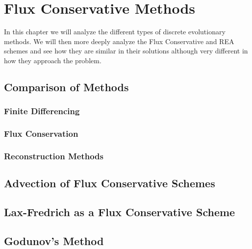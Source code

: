 \chapter{Flux Conservative Methods}
In this chapter we will analyze the different types of discrete evolutionary methods. We will then more deeply analyze the Flux Conservative and REA schemes and see how they are similar in  their solutions although very different in how they approach the problem.
\section{Comparison of Methods}
\subsection{Finite Differencing}
\subsection{Flux Conservation}
\subsection{Reconstruction Methods}
\section{Advection of Flux Conservative Schemes}
\section{Lax-Fredrich as a Flux Conservative Scheme}
\section{Godunov's Method}
